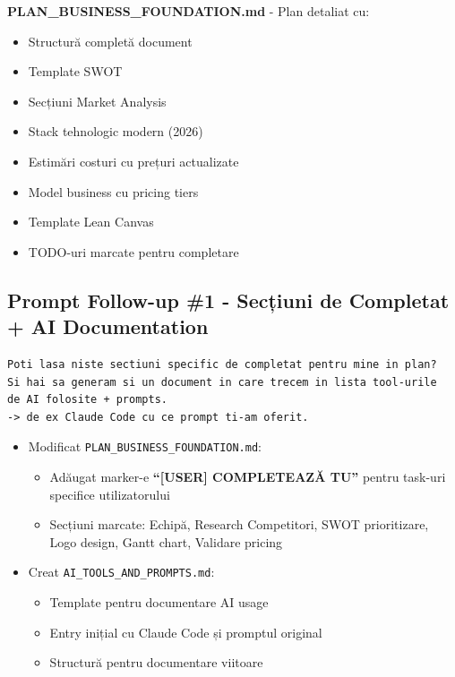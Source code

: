 \documentclass[11pt,a4paper]{article}
\begin{document}
\begin{tcolorbox}[colback=outputbackground,colframe=green!75!black,title=Output Generat]
\textbf{PLAN\_BUSINESS\_FOUNDATION.md} - Plan detaliat cu:
\begin{itemize}[leftmargin=*]
    \item Structură completă document
    \item Template SWOT
    \item Secțiuni Market Analysis
    \item Stack tehnologic modern (2026)
    \item Estimări costuri cu prețuri actualizate
    \item Model business cu pricing tiers
    \item Template Lean Canvas
    \item TODO-uri marcate pentru completare
\end{itemize}
\end{tcolorbox}

\subsection{Prompt Follow-up \#1 - Secțiuni de Completat + AI Documentation}

\begin{tcolorbox}[colback=promptbackground,colframe=blue!75!black,title=Prompt Input]
\begin{verbatim}
Poti lasa niste sectiuni specific de completat pentru mine in plan?
Si hai sa generam si un document in care trecem in lista tool-urile
de AI folosite + prompts.
-> de ex Claude Code cu ce prompt ti-am oferit.
\end{verbatim}
\end{tcolorbox}

\begin{tcolorbox}[colback=outputbackground,colframe=green!75!black,title=Output Generat]
\begin{itemize}[leftmargin=*]
    \item Modificat \texttt{PLAN\_BUSINESS\_FOUNDATION.md}:
    \begin{itemize}
        \item Adăugat marker-e \textbf{``[USER] COMPLETEAZĂ TU''} pentru task-uri specifice utilizatorului
        \item Secțiuni marcate: Echipă, Research Competitori, SWOT prioritizare, Logo design, Gantt chart, Validare pricing
    \end{itemize}
    \item Creat \texttt{AI\_TOOLS\_AND\_PROMPTS.md}:
    \begin{itemize}
        \item Template pentru documentare AI usage
        \item Entry inițial cu Claude Code și promptul original
        \item Structură pentru documentare viitoare
    \end{itemize}
\end{itemize}
\end{tcolorbox}
\end{document}
